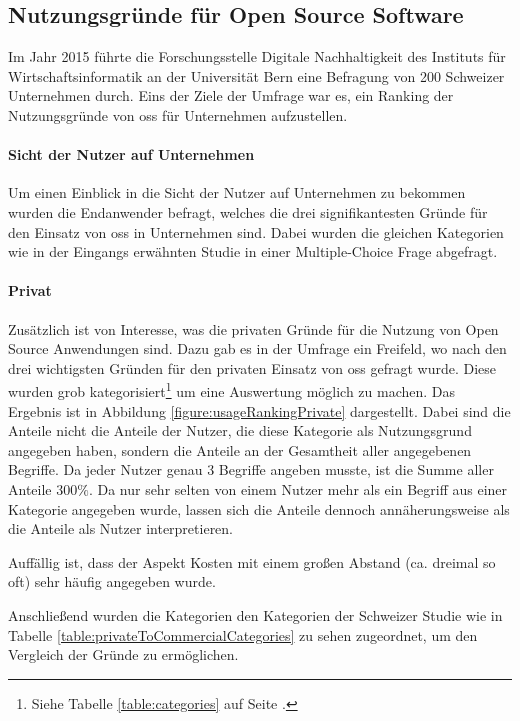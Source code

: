 \documentclass[a4paper]{article}
\begin{document}
            
        \subsection{Nutzungsgründe für Open Source Software}
            \label{section:usageReasons}
            Im Jahr 2015 führte die Forschungsstelle Digitale Nachhaltigkeit des Instituts für Wirtschaftsinformatik an der Universität Bern eine Befragung von 200 Schweizer Unternehmen durch\cite{oss:studie}. Eins der Ziele der Umfrage war es, ein Ranking der Nutzungsgründe von \gls{oss} für Unternehmen aufzustellen.

            \paragraph{Sicht der Nutzer auf Unternehmen}
                Um einen Einblick in die Sicht der Nutzer auf Unternehmen zu bekommen wurden die Endanwender befragt, welches die drei signifikantesten Gründe für den Einsatz von \gls{oss} in Unternehmen sind. Dabei wurden die gleichen Kategorien wie in der Eingangs erwähnten Studie in einer Multiple-Choice Frage abgefragt.

            \paragraph{Privat}
                Zusätzlich ist von Interesse, was die privaten Gründe für die Nutzung von Open Source Anwendungen sind. Dazu gab es in der Umfrage ein Freifeld, wo nach den drei wichtigsten Gründen für den privaten Einsatz von \gls{oss} gefragt wurde. Diese wurden grob kategorisiert\footnote{Siehe Tabelle \ref{table:categories} auf Seite \pageref{table:categories}.} um eine Auswertung möglich zu machen. Das Ergebnis ist in Abbildung \ref{figure:usageRankingPrivate} dargestellt. Dabei sind die Anteile nicht die Anteile der Nutzer, die diese Kategorie als Nutzungsgrund angegeben haben, sondern die Anteile an der Gesamtheit aller angegebenen Begriffe. Da jeder Nutzer genau 3 Begriffe angeben musste, ist die Summe aller Anteile $300\%$. Da nur sehr selten von einem Nutzer mehr als ein Begriff aus einer Kategorie angegeben wurde, lassen sich die Anteile dennoch annäherungsweise als die Anteile als Nutzer interpretieren.
                
                Auffällig ist, dass der Aspekt Kosten mit einem großen Abstand (ca. dreimal so oft) sehr häufig angegeben wurde.
                
                Anschließend wurden die Kategorien den Kategorien der Schweizer Studie wie in Tabelle \ref{table:privateToCommercialCategories} zu sehen zugeordnet, um den Vergleich der Gründe zu ermöglichen.
                
\end{document}
